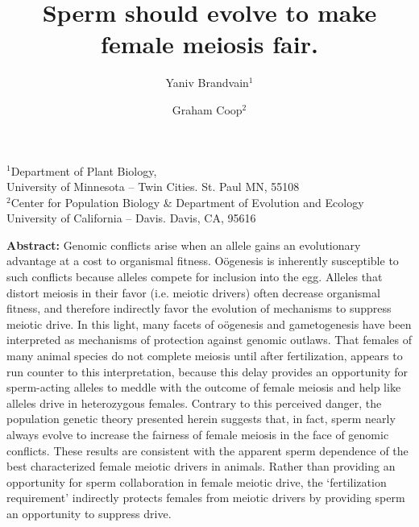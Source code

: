 \documentclass[12pt,letterpaper]{article}
\title{  Sperm should evolve to make female meiosis fair.  }
\author{Yaniv Brandvain$^1$ \and Graham Coop$^2$ }
\date{}
\begin{document}
\maketitle
\begin{center}
$^1$Department of Plant Biology, \\ University of Minnesota -- Twin
Cities. St. Paul MN, 55108 \\
$^2$Center for Population Biology \& Department of Evolution and Ecology \\ University of California -- Davis. Davis, CA, 95616
\end{center}



\newpage

{\bf Abstract:}
Genomic conflicts arise when an allele gains an evolutionary advantage at a cost to organismal fitness. 
O\"{o}genesis is inherently susceptible to such conflicts
because alleles compete for inclusion into the egg. 
Alleles that distort meiosis in their favor (i.e. meiotic drivers) often decrease organismal fitness,
	and therefore indirectly favor the evolution of mechanisms to suppress meiotic drive. 
In this light, many facets of  o\"{o}genesis and gametogenesis have been 
	interpreted as mechanisms of protection against genomic outlaws. 
That females  of many animal species do not complete meiosis until after fertilization, 
     appears to run counter to this interpretation,
     because this delay provides an opportunity for sperm-acting alleles to
     meddle with the outcome of female meiosis and help like alleles drive in heterozygous females. 
Contrary to this perceived danger, the population genetic theory presented herein suggests that, 
	in fact, sperm nearly always evolve to increase the fairness of female
        meiosis in the face of genomic conflicts. 
These results are consistent with the apparent sperm dependence of the best characterized female meiotic drivers in animals.   
Rather than providing an opportunity for sperm collaboration in female meiotic drive,
        the `fertilization requirement'  indirectly protects females from
        meiotic drivers by providing sperm an opportunity to
        suppress drive. 
\newpage
\end{document}
